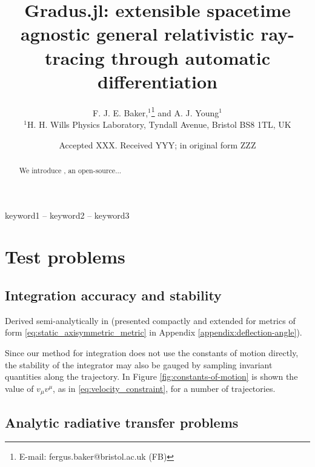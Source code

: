 \documentclass[fleqn,usenatbib]{mnras}
\title[Gradus.jl]{Gradus.jl: extensible spacetime agnostic general relativistic ray-tracing through automatic differentiation}
\author[F. J. E. Baker et al.]{
F. J. E. Baker,$^{1}$\thanks{E-mail: fergus.baker@bristol.ac.uk (FB)}
and A. J. Young$^{1}$
\\
$^{1}$H. H. Wills Physics Laboratory, Tyndall Avenue, Bristol BS8 1TL, UK
}
\date{Accepted XXX. Received YYY; in original form ZZZ}
\begin{document}
\label{firstpage}
\pagerange{\pageref{firstpage}--\pageref{lastpage}}
\maketitle

\begin{abstract}
	We introduce \Gradus, an open-source...
\end{abstract}

\begin{keywords}
keyword1 -- keyword2 -- keyword3
\end{keywords}









\section{Test problems}

\subsection{Integration accuracy and stability}


Derived semi-analytically in \cite{iyer_lights_2009} (presented compactly and extended for metrics of form \eqref{eq:static_axisymmetric_metric} in Appendix \ref{appendix:deflection-angle}).

Since our method for integration does not use the constants of motion directly, the stability of the integrator may also be gauged by sampling invariant quantities along the trajectory. In Figure \ref{fig:constants-of-motion} is shown the value of $v_\mu v^\mu$, as in \eqref{eq:velocity_constraint}, for a number of trajectories.


\subsection{Analytic radiative transfer problems}
\end{document}
